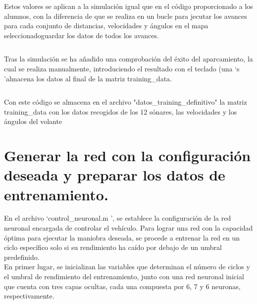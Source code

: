 \documentclass[a4paper, 12pt]{article}
\begin{document}
        \inputminted[fontsize=\scriptsize, linenos, breaklines=true, xleftmargin=0.75cm, frame=lines, firstline=79, lastline=103]{matlab}{code/maniobra_park_ackerman_datos_entrenamiento_alumnos.m}
    
        Estos valores se aplican a la simulación igual que en el código proporcionado a los alumnos, con la diferencia de que se realiza en un bucle para jecutar los avances para cada conjunto de distancias, velocidades y ángulos en el mapa seleccionadoguardar los datos de todos los avances.
    
        \inputminted[fontsize=\scriptsize, linenos, breaklines=true, xleftmargin=0.75cm, frame=lines, firstline=104, lastline=110]{matlab}{code/maniobra_park_ackerman_datos_entrenamiento_alumnos.m}
    
        Tras la simulación se ha añadido una comprobación del éxito del aparcamiento, la cual se realiza manualmente, introduciendo el resultado con el teclado (una \textquoteleft s \textquoteright almacena los datos al final de la matriz training\_data.
    
        \inputminted[fontsize=\scriptsize, linenos, breaklines=true, xleftmargin=0.75cm, frame=lines, firstline=112, lastline=122]{matlab}{code/maniobra_park_ackerman_datos_entrenamiento_alumnos.m}
    
        Con este código se almacena en el archivo "datos\_training\_definitivo" la matriz training\_data con los datos recogidos de los 12 sónares, las velocidades y los ángulos del volante
    
    \section{Generar la red con la configuración deseada y preparar los datos de entrenamiento.}

        En el archivo \textquoteleft control\_neuronal.m \textquoteright, se establece la configuración de la red neuronal encargada de controlar el vehículo. Para lograr una red con la capacidad óptima para ejecutar la maniobra deseada, se procede a entrenar la red en un ciclo específico solo si su rendimiento ha caído por debajo de un umbral predefinido.\\
        En primer lugar, se inicializan las variables que determinan el número de ciclos y el umbral de rendimiento del entrenamiento, junto con una red neuronal inicial que cuenta con tres capas ocultas, cada una compuesta por 6, 7 y 6 neuronas, respectivamente.
    
\end{document}

